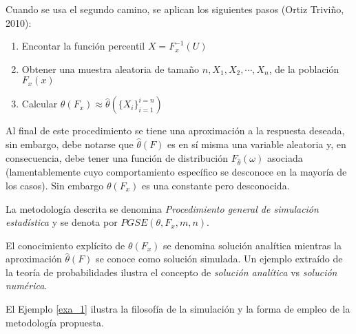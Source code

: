 Cuando se usa el segundo camino, se aplican los siguientes pasos (Ortiz Triviño, 2010):

\begin{enumerate}
    \item Encontar la función percentil $X = F_x^{-1}(U)$
    \item Obtener una muestra aleatoria de tamaño $n, X_1, X_2, \cdots, X_n$, de la población $F_x(x)$
    \item Calcular $\theta(F_x)\approx\hat{\theta}(\{X_i\}_{i=1}^{i=n})$
\end{enumerate}

Al final de este procedimiento se tiene una aproximación a la respuesta deseada, sin embargo, debe notarse que $\hat{\theta}(F)$ es en sí misma una variable aleatoria y, en consecuencia, debe tener una función de distribución $F_{\hat{\theta}}(\omega)$ asociada (lamentablemente cuyo comportamiento específico se desconoce en la mayoría de los casos). Sin embargo $\theta(F_x)$ es una constante pero desconocida.

La metodología descrita se denomina \textit{Procedimiento general de simulación estadística} y se denota por $\textit{PGSE}(\theta,F_x,m,n)$.

El conocimiento explícito de $\theta(F_x)$ se denomina solución analítica mientras la aproximación $\hat{\theta}(F)$ se conoce como solución simulada. Un ejemplo extraído de la teoría de probabilidades ilustra el concepto de \textit{solución analítica} vs \textit{solución numérica}.

El  Ejemplo \ref{exa_1} ilustra la filosofía de la simulación y la forma de empleo de la metodología propuesta.





\label{exa_1}

\example

